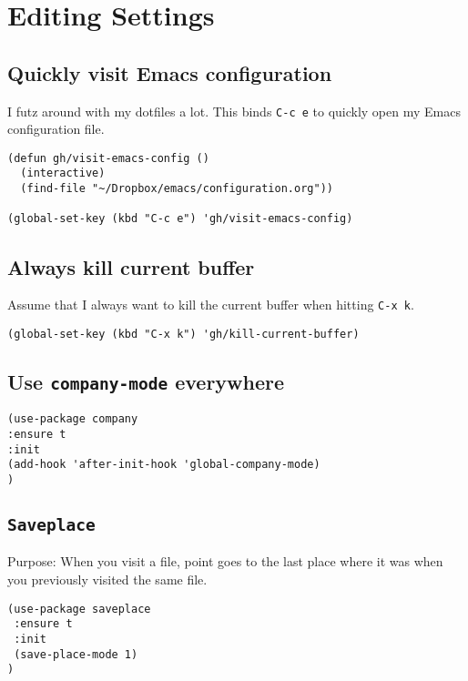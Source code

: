 \documentclass[11pt]{article}
\begin{document}
\section{Editing Settings}
\label{sec:org0750d42}
\subsection{Quickly visit Emacs configuration}
\label{sec:org3f0cd8f}

I futz around with my dotfiles a lot. This binds \texttt{C-c e} to quickly open my
Emacs configuration file.

\begin{verbatim}
(defun gh/visit-emacs-config ()
  (interactive)
  (find-file "~/Dropbox/emacs/configuration.org"))

(global-set-key (kbd "C-c e") 'gh/visit-emacs-config)
\end{verbatim}

\subsection{Always kill current buffer}
\label{sec:org48a5974}

Assume that I always want to kill the current buffer when hitting \texttt{C-x k}.

\begin{verbatim}
(global-set-key (kbd "C-x k") 'gh/kill-current-buffer)
\end{verbatim}

\subsection{Use \texttt{company-mode} everywhere}
\label{sec:org3909f6b}

\begin{verbatim}
(use-package company
:ensure t
:init
(add-hook 'after-init-hook 'global-company-mode)
)
\end{verbatim}

\subsection{\texttt{Saveplace}}
\label{sec:orgbdb454b}

Purpose: When you visit a file, point goes to the last place where it was when you previously visited the same file.

\begin{verbatim}
(use-package saveplace
 :ensure t
 :init
 (save-place-mode 1)
)
\end{verbatim}
\end{document}
